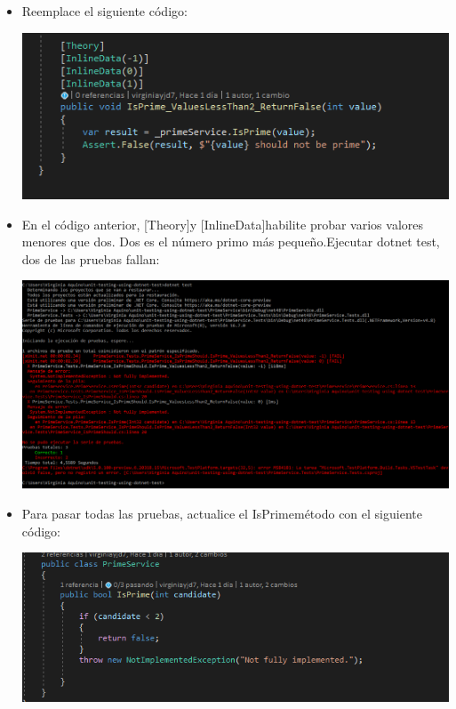 \begin{itemize}
\begin{center}
\end{center} 
\item Reemplace el siguiente código:
\begin{center}
\includegraphics[width=\columnwidth]{images/lab5}\newline
\end{center} 
\item En el código anterior, [Theory]y [InlineData]habilite probar varios valores menores que
dos. Dos es el número primo más pequeño.Ejecutar dotnet test, dos de las pruebas fallan:
\begin{center}
\includegraphics[width=\columnwidth]{images/resu3}\newline
\end{center} 
\item Para pasar todas las pruebas, actualice el IsPrimemétodo con el siguiente código:
\begin{center}
\includegraphics[width=\columnwidth]{images/lab6}\newline

\end{center}
\end{itemize}
